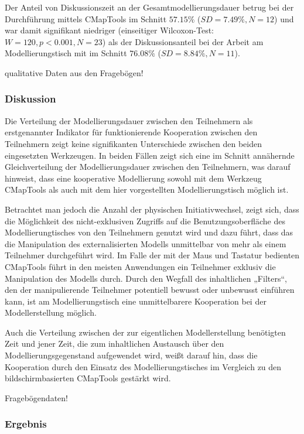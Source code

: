 Der Anteil von Diskussionszeit an der Gesamtmodellierungsdauer betrug bei der Durchführung mittels CMapTools im Schnitt $57.15\%$ ($SD=7.49\%, N=12$) und war damit signifikant niedriger (einseitiger Wilcoxon-Test: $W=120, p<0.001, N=23$) als der Diskussionsanteil bei der Arbeit am Modellierungstisch mit im Schnitt $76.08\%$ ($SD=8.84\%, N=11$).

\todo qualitative Daten aus den Fragebögen!

\subsubsection{Diskussion} %

Die Verteilung der Modellierungsdauer zwischen den Teilnehmern als erstgenannter Indikator für funktionierende Kooperation zwischen den Teilnehmern zeigt keine signifikanten Unterschiede zwischen den beiden eingesetzten Werkzeugen. In beiden Fällen zeigt sich eine im Schnitt annähernde Gleichverteilung der Modellierungsdauer zwischen den Teilnehmern, was darauf hinweist, dass eine kooperative Modellierung sowohl mit dem Werkzeug CMapTools als auch mit dem hier vorgestellten Modellierungstisch möglich ist.

Betrachtet man jedoch die Anzahl der physischen Initiativwechsel, zeigt sich, dass die Möglichkeit des nicht-exklusiven Zugriffs auf die Benutzungsoberfläche des Modellierungtisches von den Teilnehmern genutzt wird und dazu führt, dass das die Manipulation des externalisierten Modells unmittelbar von mehr als einem Teilnehmer durchgeführt wird. Im Falle der mit der Maus und Tastatur bedienten CMapTools führt in den meisten Anwendungen ein Teilnehmer exklusiv die Manipulation des Modells durch. Durch den Wegfall des inhaltlichen „Filters“, den der manipulierende Teilnehmer potentiell bewusst oder unbewusst einführen kann, ist am Modellierungstisch eine unmittelbarere Kooperation bei der Modellerstellung möglich.

Auch die Verteilung zwischen der zur eigentlichen Modellerstellung benötigten Zeit und jener Zeit, die zum inhaltlichen Austausch über den Modellierungsgegenstand aufgewendet wird, weißt darauf hin, dass die Kooperation durch den Einsatz des Modellierungstisches im Vergleich zu den bildschirmbasierten CMapTools gestärkt wird.

\todo Fragebögendaten!

\subsubsection{Ergebnis} %

